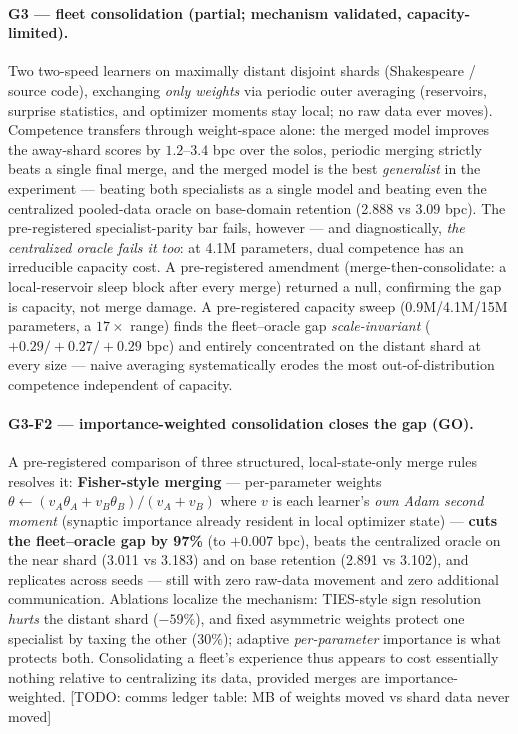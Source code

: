 \documentclass[11pt]{article}
\newcommand{\todo}[1]{\textcolor{red!70!black}{[TODO: #1]}}
\begin{document}
\paragraph{G3 --- fleet consolidation (partial; mechanism validated, capacity-limited).}
Two two-speed learners on maximally distant disjoint shards (Shakespeare / source code),
exchanging \emph{only weights} via periodic outer averaging (reservoirs, surprise statistics,
and optimizer moments stay local; no raw data ever moves). Competence transfers through
weight-space alone: the merged model improves the away-shard scores by $1.2$--$3.4$ bpc over
the solos, periodic merging strictly beats a single final merge, and the merged model is the
best \emph{generalist} in the experiment --- beating both specialists as a single model and
beating even the centralized pooled-data oracle on base-domain retention (2.888 vs 3.09 bpc).
The pre-registered specialist-parity bar fails, however --- and diagnostically, \emph{the
centralized oracle fails it too}: at 4.1M parameters, dual competence has an irreducible
capacity cost. A pre-registered amendment (merge-then-consolidate: a local-reservoir sleep
block after every merge) returned a null, confirming the gap is capacity, not merge damage.
A pre-registered capacity sweep (0.9M/4.1M/15M parameters, a $17\times$ range) finds the
fleet--oracle gap \emph{scale-invariant} ($+0.29/+0.27/+0.29$ bpc) and entirely concentrated
on the distant shard at every size --- naive averaging systematically erodes the most
out-of-distribution competence independent of capacity.

\paragraph{G3-F2 --- importance-weighted consolidation closes the gap (GO).}
A pre-registered comparison of three structured, local-state-only merge rules resolves it:
\textbf{Fisher-style merging} --- per-parameter weights
$\theta \leftarrow (v_A\theta_A + v_B\theta_B)/(v_A+v_B)$ where $v$ is each learner's
\emph{own Adam second moment} (synaptic importance already resident in local optimizer
state) --- \textbf{cuts the fleet--oracle gap by 97\%} (to $+0.007$ bpc), beats the
centralized oracle on the near shard (3.011 vs 3.183) and on base retention (2.891 vs
3.102), and replicates across seeds --- still with zero raw-data movement and zero
additional communication. Ablations localize the mechanism: TIES-style sign resolution
\emph{hurts} the distant shard ($-59\%$), and fixed asymmetric weights protect one
specialist by taxing the other ($30\%$); adaptive \emph{per-parameter} importance is what
protects both. Consolidating a fleet's experience thus appears to cost essentially nothing
relative to centralizing its data, provided merges are importance-weighted.
\todo{comms ledger table: MB of weights moved vs shard data never moved}
\end{document}
